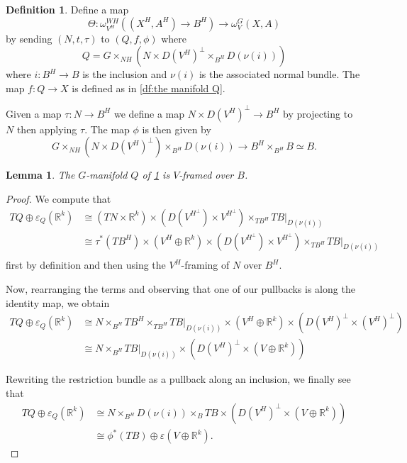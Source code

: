 \documentclass[11pt]{amsart}
\newcommand{\R}{\mathbb R}
\theoremstyle{plain}   %
\newtheorem{lem}[thm]{Lemma}
\theoremstyle{definition}
\newtheorem{df}[thm]{Definition}
\theoremstyle{remark}
\numberwithin{equation}{section}
\begin{document}
\begin{df}\label{df:manifold inverse}
Define a map 
\[
\Theta: \omega_{V^H}^{WH} ((X^H,A^H)\to B^H) \to \omega_{V}^G(X,A)
\]
by sending $(N,t,\tau)$ to $(Q,f,\phi)$ where 
\[
Q=G\times_{NH}(N\times D(V^H)^\perp\times_{B^H}D(\nu(i)))
\]
where $i:B^H\to B$ is the inclusion and $\nu(i)$ is the associated normal bundle. The map $f:Q\to X$ is defined as in \cref{df:the manifold Q}.

Given a map $\tau:N\to B^H$ we define a map $N\times D(V^H)^\perp\to B^H$ by projecting to $N$ then applying $\tau$. The map $\phi$ is then given by 
\begin{equation}\label{eq:phi tilde}
G\times_{NH}(N\times D(V^H)^\perp)\times_{B^H}D(\nu(i)) \to B^H\times_{B^H}B \simeq B.
\end{equation}
\end{df}

\begin{lem}
The $G$-manifold $Q$ of \cref{df:manifold inverse} is $V$-framed over $B$.
\end{lem}

\begin{proof}
We compute that
\begin{align*}
TQ\oplus\varepsilon_Q(\R^{k})
& \cong (TN\times \R^k) \times (D(V^{H^\perp})\times V^{H^\perp})\times_{TB^H}TB|_{D(\nu(i))}\\
& \cong \tau^*(TB^H)\times (V^H\oplus \R^k)\times (D(V^{H^\perp})\times V^{H^\perp})\times_{TB^H}TB|_{D(\nu(i))}\\
\end{align*}
first by definition and then using the $V^H$-framing of $N$ over $B^H$. 

Now, rearranging the terms and observing that one of our pullbacks is along the identity map, we obtain
\begin{align*}
TQ\oplus\varepsilon_Q(\R^{k})
&\cong N\times_{B^H}TB^H\times_{TB^H}TB|_{D(\nu(i))}\times (V^H\oplus \R^k)\times (D(V^H)^\perp\times (V^H)^\perp)\\
& \cong N\times_{B^H}TB|_{D(\nu(i))}\times (D(V^H)^\perp\times(V\oplus \R^k))
\end{align*}

Rewriting the restriction bundle as a pullback along an inclusion, we finally see that
\begin{align*}
TQ\oplus\varepsilon_Q(\R^{k})
& \cong N\times_{B^H}D(\nu(i))\times_B TB\times (D(V^H)^\perp\times(V\oplus \R^k))\\
& \cong \phi^*(TB)\oplus \varepsilon(V\oplus \R^k).
\end{align*}
\end{proof}
 
\end{document}
